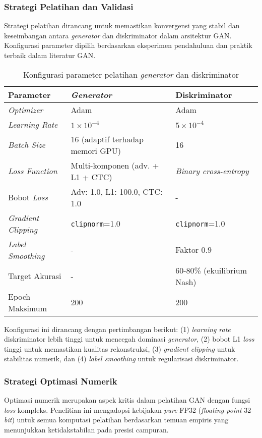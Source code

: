 \documentclass[12pt,a4paper]{article}
\begin{document}
\subsubsection{Strategi Pelatihan dan Validasi}
Strategi pelatihan dirancang untuk memastikan konvergensi yang stabil dan keseimbangan antara \textit{generator} dan diskriminator dalam arsitektur GAN. Konfigurasi parameter dipilih berdasarkan eksperimen pendahuluan dan praktik terbaik dalam literatur GAN.

\begin{table}[H]
\centering
\caption{Konfigurasi parameter pelatihan \textit{generator} dan diskriminator}
\label{tab:training-config}
\small
\begin{tabular}{|l|l|l|}
\hline
\textbf{Parameter} & \textbf{\textit{Generator}} & \textbf{Diskriminator} \\ \hline
\textit{Optimizer} & Adam & Adam \\ \hline
\textit{Learning Rate} & $1 \times 10^{-4}$ & $5 \times 10^{-4}$ \\ \hline
\textit{Batch Size} & 16 (adaptif terhadap memori GPU) & 16 \\ \hline
\textit{Loss Function} & Multi-komponen (adv. + L1 + CTC) & \textit{Binary cross-entropy} \\ \hline
Bobot \textit{Loss} & Adv: 1.0, L1: 100.0, CTC: 1.0 & - \\ \hline
\textit{Gradient Clipping} & \texttt{clipnorm}=1.0 & \texttt{clipnorm}=1.0 \\ \hline
\textit{Label Smoothing} & - & Faktor 0.9 \\ \hline
Target Akurasi & - & 60-80\% (ekuilibrium Nash) \\ \hline
Epoch Maksimum & 200 & 200 \\ \hline
\end{tabular}
\end{table}

Konfigurasi ini dirancang dengan pertimbangan berikut: (1) \textit{learning rate} diskriminator lebih tinggi untuk mencegah dominasi \textit{generator}, (2) bobot L1 \textit{loss} tinggi untuk memastikan kualitas rekonstruksi, (3) \textit{gradient clipping} untuk stabilitas numerik, dan (4) \textit{label smoothing} untuk regularisasi diskriminator.

\subsubsection{Strategi Optimasi Numerik}
Optimasi numerik merupakan aspek kritis dalam pelatihan GAN dengan fungsi \textit{loss} kompleks. Penelitian ini mengadopsi kebijakan \textit{pure} FP32 (\textit{floating-point} 32-\textit{bit}) untuk semua komputasi pelatihan berdasarkan temuan empiris yang menunjukkan ketidakstabilan pada presisi campuran.
\end{document}
